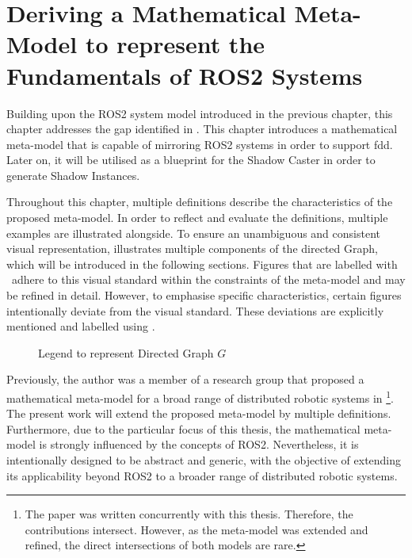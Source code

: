 \cleardoublepage
\chapter{Deriving a Mathematical Meta-Model to represent the Fundamentals of ROS2 Systems} \label{chap:concept}
    Building upon the ROS2 system model introduced in the previous chapter, this chapter addresses the gap identified in . This chapter introduces a mathematical meta-model that is capable of mirroring ROS2 systems in order to support \acl{fdd}. Later on, it will be utilised as a blueprint for the Shadow Caster in order to generate Shadow Instances.

    Throughout this chapter, multiple definitions describe the characteristics of the proposed meta-model. In order to reflect and evaluate the definitions, multiple examples are illustrated alongside. To ensure an unambiguous and consistent visual representation,  illustrates multiple components of the directed Graph, which will be introduced in the following sections. Figures that are labelled with \legend~adhere to this visual standard within the constraints of the meta-model and may be refined in detail. However, to emphasise specific characteristics, certain figures intentionally deviate from the visual standard. These deviations are explicitly mentioned and labelled using \protect\legendadapted.
    \begin{figure}[h]
        \centering
        \hypertarget{target:legend}{}
        
        \caption[Legend to represent Directed Graph]{Legend to represent Directed Graph $G$ \legend} \label{fig:tikz:legend}
    \end{figure}

    Previously, the author was a member of a research group that proposed a mathematical meta-model for a broad range of distributed robotic systems in \cite{adaPaper}\footnote{The paper was written concurrently with this thesis. Therefore, the contributions intersect. However, as the meta-model was extended and refined, the direct intersections of both models are rare.}. The present work will extend the proposed meta-model by multiple definitions. Furthermore, due to the particular focus of this thesis, the mathematical meta-model is strongly influenced by the concepts of ROS2. Nevertheless, it is intentionally designed to be abstract and generic, with the objective of extending its applicability beyond ROS2 to a broader range of distributed robotic systems.

